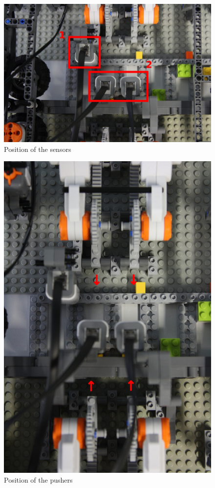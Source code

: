 \documentclass[%
  a4paper,%
  11pt,%
  blue,%
  hyperref	%
  ]{tubsartcl}
\begin{document}
\begin{figure}[!htb]
\begin{center}
\includegraphics[scale=0.3]{graphics/sensors.jpg}
\end{center}
\caption{Position of the sensors}
\end{figure}

\begin{figure}[!htb]
\begin{center}
\includegraphics[scale=0.4]{graphics/topview_pushers.jpg}
\end{center}
\caption{Position of the pushers}
\end{figure}
\end{document}

